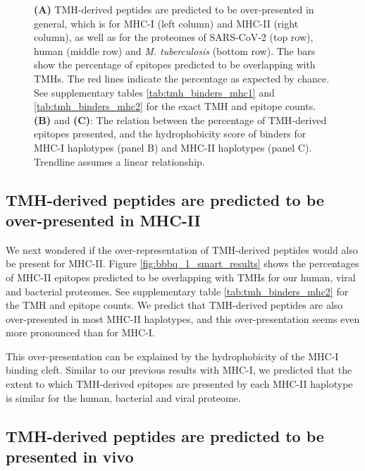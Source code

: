 \begin{figure}
\begin{subfigure}[t]{0.4\textwidth}
    \label{fig:hydrophobicity_2}
  \end{subfigure}  
  \caption{
    \textbf{(A)} 
    TMH-derived peptides are predicted to be over-presented in general,
    which is for MHC-I (left column) and MHC-II (right column),
    as well as for the proteomes of SARS-CoV-2 (top row), human (middle 
    row) and \emph{M. tuberculosis} (bottom row).
    The bars show the percentage of epitopes predicted to be 
    overlapping with TMHs.
    The red lines indicate the percentage as expected by chance.
    See supplementary tables \ref{tab:tmh_binders_mhc1} and \ref{tab:tmh_binders_mhc2}
    for the exact TMH and  epitope counts.
    \textbf{(B)} and \textbf{(C)}:
    The relation between the percentage of TMH-derived epitopes presented,
    and the hydrophobicity score of binders for MHC-I haplotypes (panel B)
    and MHC-II haplotypes (panel C). Trendline assumes a linear relationship.
  }
\end{figure}

\subsection{TMH-derived peptides are predicted to be over-presented in MHC-II}

We next wondered if the over-representation of TMH-derived peptides would also be present for MHC-II. 
Figure \ref{fig:bbbq_1_smart_results} shows the percentages of MHC-II epitopes predicted to be overlapping 
with TMHs for our human, viral and bacterial proteomes.
See supplementary table \ref{tab:tmh_binders_mhc2} 
for the TMH and epitope counts.
We predict that TMH-derived peptides are also over-presented in most MHC-II haplotypes, 
and this over-presentation seems even more pronounced than for MHC-I. 

This over-presentation can be explained by the hydrophobicity of the MHC-I binding cleft.
Similar to our previous results with MHC-I, we predicted that the extent to which TMH-derived
epitopes are presented by each MHC-II haplotype is similar for the human, bacterial and viral proteome.

\subsection{TMH-derived peptides are predicted to be presented in vivo}

